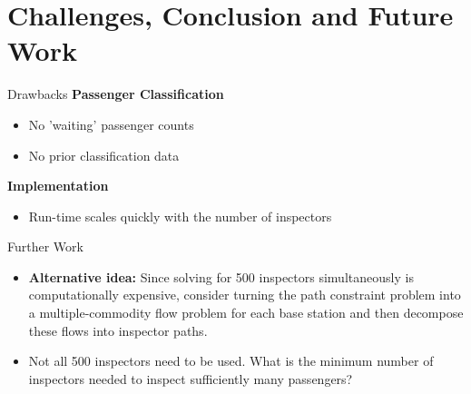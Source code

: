 \documentclass[handout]{beamer}
\begin{document}
    





\section{Challenges, Conclusion and Future Work}

\begin{frame}{Drawbacks}
   \textbf{Passenger Classification}
        \begin{itemize}
            \item No 'waiting' passenger counts
            \item No prior classification data
        \end{itemize}
       \textbf{Implementation}
        \begin{itemize}
            \item Run-time scales quickly with the number of inspectors
        \end{itemize}
    
\end{frame}

\begin{frame}{Further Work}
    \begin{itemize}
        \item \textbf{Alternative idea:} Since solving for 500 inspectors simultaneously is computationally expensive, consider turning the path constraint problem into a multiple-commodity flow problem for each base station and then decompose these flows into inspector paths.
        \item Not all 500 inspectors need to be used. What is the minimum number of inspectors needed to inspect sufficiently many passengers?
    \end{itemize}
\end{frame}
\end{document}
